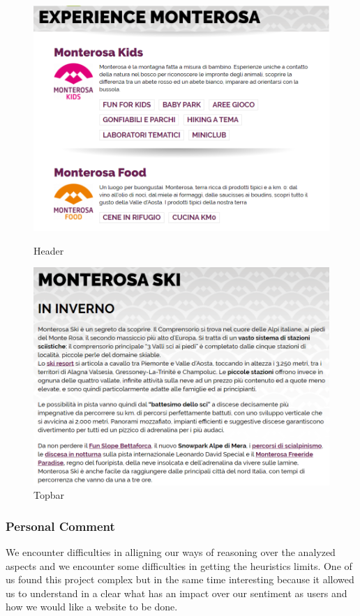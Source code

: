 \begin{figure}[h!]
	\centering
	\begin{minipage}[b]{0.4\textwidth}
    		\includegraphics[width=\textwidth]{./assets/structure1.png}
		\caption{Header}
	\end{minipage}
	\hfill
	\centering
	\begin{minipage}[b]{0.4\textwidth}
    		\includegraphics[width=\textwidth]{./assets/structure2.png}
		\caption{Topbar}
	\end{minipage}
\end{figure}
\FloatBarrier

\subsubsection*{Personal Comment}
We encounter difficulties in alligning our ways of reasoning over the analyzed aspects and we encounter some difficulties in getting the heuristics limits. One of us found this project complex but in the same time interesting because it allowed us to understand in a clear what has an impact over our sentiment as users and how we would like a website to be done.
